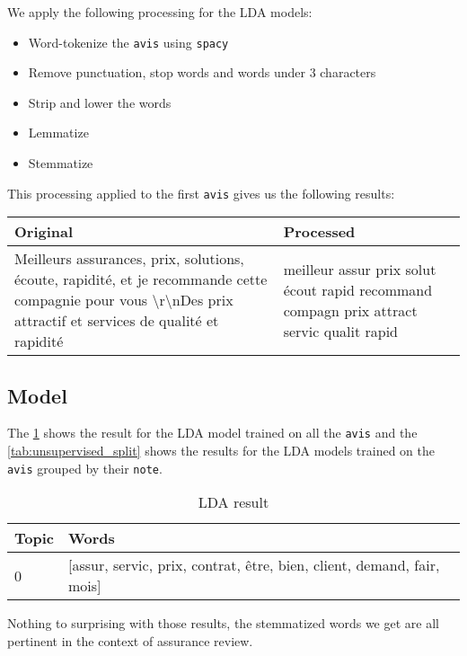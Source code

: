 \documentclass[a4paper, 12pt, one column]{article}
\begin{document}
We apply the following processing for the LDA models:
\begin{itemize}
    \item Word-tokenize the \lstinline{avis} using \lstinline{spacy}
    \item Remove punctuation, stop words and words under 3 characters
    \item Strip and lower the words
    \item Lemmatize
    \item Stemmatize
\end{itemize}

This processing applied to the first \lstinline{avis} gives us the following results:

\begin{table}[H]
\centering
\begin{tabular}{|p{7cm}|p{7cm}|}
\hline
\textbf{Original} &
  \textbf{Processed} \\ \hline
Meilleurs assurances, prix, solutions, écoute, rapidité, et je recommande cette compagnie pour vous \textbackslash{}r\textbackslash{}nDes prix attractif et services de qualité et rapidité  &
  meilleur assur prix solut écout rapid recommand compagn prix attract servic qualit rapid \\ \hline
\end{tabular}
\end{table}

\newpage
\subsection{Model}

The \cref{tab:unsupervised} shows the result for the LDA model trained on all the \lstinline{avis} and the \cref{tab:unsupervised_split} shows the results for the LDA models trained on the \lstinline{avis} grouped by their \lstinline{note}.

\begin{table}[H]
\centering
\begin{tabular}{|p{1cm}|p{13cm}|}
\hline
 \textbf{Topic} &                                                                  \textbf{Words} \\
\hline
     0 & [assur, servic, prix, contrat, être, bien, client, demand, fair, mois] \\
\hline
\end{tabular}
\label{tab:unsupervised}
\caption{LDA result}
\end{table}

Nothing to surprising with those results, the stemmatized words we get are all pertinent in the context of assurance review.
\end{document}
